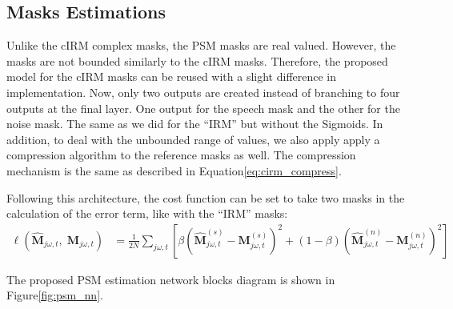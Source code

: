 \subsection{Masks Estimations}
Unlike the cIRM complex masks, the PSM masks are real valued.
However, the masks are not bounded similarly to the cIRM masks.
Therefore, the proposed model for the cIRM masks can be reused
with a slight difference in implementation. 
Now, only two outputs are created 
instead of branching to four outputs at the final layer.
One output for the speech mask and the other for the noise mask. 
The same as we did for the ``IRM'' but without the Sigmoids.
In addition, to deal with the unbounded range of values, 
we also apply apply a compression algorithm to the reference masks as well.
The compression mechanism is the same as 
described in Equation\;\ref{eq:cirm_compress}.

Following this architecture, the cost function can be set
to take two masks in the calculation of the error term,
like with the ``IRM'' masks:
\begin{align}\label{eq:psm_costf}
    \ell(\mathbf{\widehat{M}}_{j\omega, t},\;\mathbf{M}_{j\omega, t}) & = 
        \frac{1}{2N}\sum_{j\omega, t}
        \left[ 
            \beta\!\left( 
                \mathbf{\widehat{M}}^{(s)}_{j\omega, t} - 
                \mathbf{M}^{(s)}_{j\omega, t} 
            \right)^{2} 
            + \left( 1- \beta \right)\!
            \left(
                \mathbf{\widehat{M}}^{(n)}_{j\omega, t} - 
                \mathbf{M}^{(n)}_{j\omega, t} 
            \right)^{2} 
        \right]
\end{align}

The proposed PSM estimation network blocks diagram is shown in 
Figure\;\ref{fig:psm_nn}.

